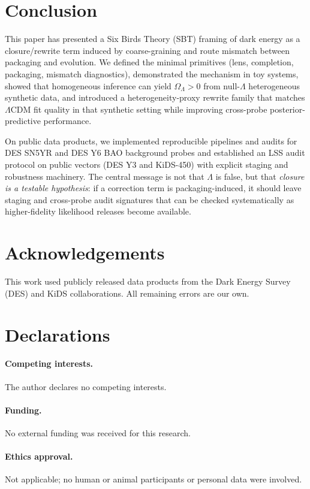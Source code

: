 \documentclass[11pt]{article}
\theoremstyle{definition}
\theoremstyle{plain}
\theoremstyle{remark}
\begin{document}
\section{Conclusion}\label{sec:conclusion}
This paper has presented a Six Birds Theory (SBT) framing of dark energy as a closure/rewrite term induced by coarse-graining and route mismatch between packaging and evolution. We defined the minimal primitives (lens, completion, packaging, mismatch diagnostics), demonstrated the mechanism in toy systems, showed that homogeneous inference can yield $\Omega_\Lambda>0$ from null-$\Lambda$ heterogeneous synthetic data, and introduced a heterogeneity-proxy rewrite family that matches $\Lambda$CDM fit quality in that synthetic setting while improving cross-probe posterior-predictive performance.

On public data products, we implemented reproducible pipelines and audits for DES SN5YR and DES Y6 BAO background probes and established an LSS audit protocol on public vectors (DES Y3 and KiDS-450) with explicit staging and robustness machinery. The central message is not that $\Lambda$ is false, but that \emph{closure is a testable hypothesis}: if a correction term is packaging-induced, it should leave staging and cross-probe audit signatures that can be checked systematically as higher-fidelity likelihood releases become available.

\section*{Acknowledgements}
This work used publicly released data products from the Dark Energy Survey (DES) and KiDS collaborations. All remaining errors are our own.

\section*{Declarations}

\paragraph{Competing interests.}
The author declares no competing interests.

\paragraph{Funding.}
No external funding was received for this research.

\paragraph{Ethics approval.}
Not applicable; no human or animal participants or personal data were involved.
\end{document}
